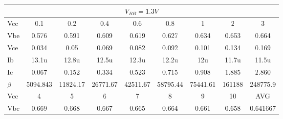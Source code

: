         \begin{table}[H]
            \centering
            \begin{tabular}{ccccccccc}
                \midrule
            \multicolumn{9}{c}{$V_{BB}=1.3V$}\\
            \midrule
            \multicolumn{1}{l|}{Vcc}     & \multicolumn{1}{c}{0.1}      & \multicolumn{1}{c}{0.2}      & \multicolumn{1}{c}{0.4}      & \multicolumn{1}{c}{0.6}      & \multicolumn{1}{c}{0.8}      & \multicolumn{1}{c}{1}        & \multicolumn{1}{c}{2}        & 3        \\
            \multicolumn{1}{l|}{Vbe}     & \multicolumn{1}{c}{0.576}    & \multicolumn{1}{c}{0.591}    & \multicolumn{1}{c}{0.609}    & \multicolumn{1}{c}{0.619}    & \multicolumn{1}{c}{0.627}    & \multicolumn{1}{c}{0.634}    & \multicolumn{1}{c}{0.653}    & 0.664    \\
            \multicolumn{1}{l|}{Vce}     & \multicolumn{1}{c}{0.034}    & \multicolumn{1}{c}{0.05}     & \multicolumn{1}{c}{0.069}    & \multicolumn{1}{c}{0.082}    & \multicolumn{1}{c}{0.092}    & \multicolumn{1}{c}{0.101}    & \multicolumn{1}{c}{0.134}    & 0.169    \\
            \multicolumn{1}{l|}{Ib}      & \multicolumn{1}{c}{13.1u}    & \multicolumn{1}{c}{12.8u}    & \multicolumn{1}{c}{12.5u}    & \multicolumn{1}{c}{12.3u}    & \multicolumn{1}{c}{12.2u}    & \multicolumn{1}{c}{12u}      & \multicolumn{1}{c}{11.7u}    & 11.5u    \\
            \multicolumn{1}{l|}{Ic}      & \multicolumn{1}{c}{0.067}    & \multicolumn{1}{c}{0.152}    & \multicolumn{1}{c}{0.334}    & \multicolumn{1}{c}{0.523}    & \multicolumn{1}{c}{0.715}    & \multicolumn{1}{c}{0.908}    & \multicolumn{1}{c}{1.885}    & 2.860    \\
            \multicolumn{1}{l|}{$\beta$} & \multicolumn{1}{c}{5094.843} & \multicolumn{1}{c}{11824.17} & \multicolumn{1}{c}{26771.67} & \multicolumn{1}{c}{42511.67} & \multicolumn{1}{c}{58795.44} & \multicolumn{1}{c}{75441.61} & \multicolumn{1}{c}{161188}   & 248775.9 \\
            \midrule
            \midrule
            \multicolumn{1}{l|}{Vcc}     & \multicolumn{1}{c}{4}        & \multicolumn{1}{c}{5}        & \multicolumn{1}{c}{6}        & \multicolumn{1}{c}{7}        & \multicolumn{1}{c}{8}        & \multicolumn{1}{c}{9}        & \multicolumn{1}{c}{10}       & AVG      \\
            \multicolumn{1}{l|}{Vbe}     & \multicolumn{1}{c}{0.669}    & \multicolumn{1}{c}{0.668}    & \multicolumn{1}{c}{0.667}    & \multicolumn{1}{c}{0.665}    & \multicolumn{1}{c}{0.664}    & \multicolumn{1}{c}{0.661}    & \multicolumn{1}{c}{0.658}    & 0.641667 \\

\end{tabular}
\end{table}
